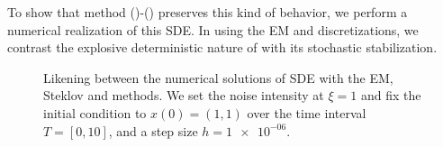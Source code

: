 	To show that \SM method ()-() preserves this kind of behavior, we perform a numerical realization of this SDE.
In  using the EM and \SM discretizations,  we contrast the explosive deterministic nature of
 with its stochastic stabilization.
%
%
%
\begin{figure}[h!]
	\centering
	\caption{
		Likening between the numerical solutions of SDE  
		with the EM, Steklov and  \SM methods. We set the noise intensity at $\xi=1$ and fix the initial condition
		to $x(0)=(1, 1)$ over the time interval $T = [0, 10]$, and a step size $h=\num{1e-06}$.
	}
	\label{fig:MaoPopDynSDE}
\end{figure}

\restoregeometry